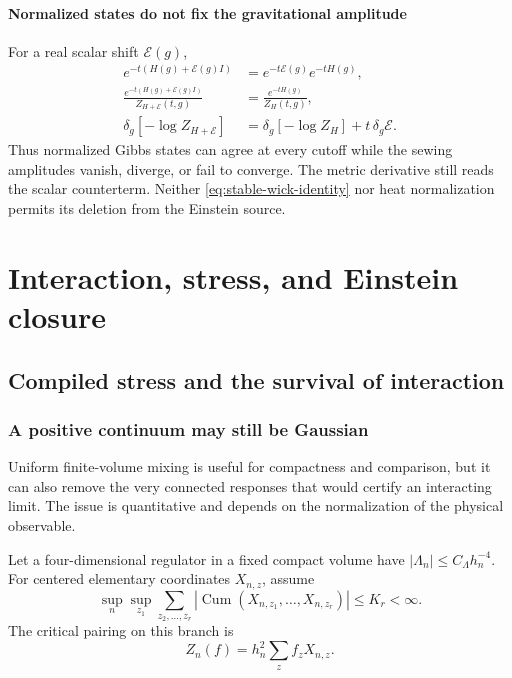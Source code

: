 \documentclass[11pt,a4paper,oneside]{book}
\theoremstyle{plain}
\theoremstyle{definition}
\theoremstyle{remark}
\newcommand{\Cum}{\operatorname{Cum}}
\newcommand{\abs}[1]{\left\lvert#1\right\rvert}
\newcommand{\src}[2]{\cite{#1}}
\begin{document}
\subsection{Normalized states do not fix the gravitational amplitude}
For a real scalar shift $\mathcal E(g)$,
\begin{equation}
 \begin{aligned}
 e^{-t(H(g)+\mathcal E(g)I)}&=e^{-t\mathcal E(g)}e^{-tH(g)},\\
 \frac{e^{-t(H(g)+\mathcal E(g)I)}}{Z_{H+\mathcal E}(t,g)}
 &=\frac{e^{-tH(g)}}{Z_H(t,g)},\\
 \delta_g[-\log Z_{H+\mathcal E}]&=
     \delta_g[-\log Z_H]+t\,\delta_g\mathcal E.
 \end{aligned}
 \label{eq:scalar-shift-source}
\end{equation}
Thus normalized Gibbs states can agree at every cutoff while the sewing
amplitudes vanish, diverge, or fail to converge.  The metric derivative
still reads the scalar counterterm.  Neither
\eqref{eq:stable-wick-identity} nor heat normalization permits its deletion
from the Einstein source.
\src{R15}{prop:v15v93-vacuum-shift,cnt:v15v93-shift}


\part{Interaction, stress, and Einstein closure}
\chapter{Compiled stress and the survival of interaction}
\label{ch:stress}
\section{A positive continuum may still be Gaussian}
Uniform finite-volume mixing is useful for compactness and comparison, but it can also remove the very connected responses that would certify an interacting limit. The issue is quantitative and depends on the normalization of the physical observable.

Let a four-dimensional regulator in a fixed compact volume have $|\Lambda_n|\le C_\Lambda h_n^{-4}$. For centered elementary coordinates $X_{n,z}$, assume
\begin{equation}
 \sup_n\sup_{z_1}\sum_{z_2,\ldots,z_r}
 \abs{\Cum(X_{n,z_1},\ldots,X_{n,z_r})}\le K_r<\infty.
 \label{eq:cumulant-stock}
\end{equation}
The critical pairing on this branch is
\begin{equation}
 Z_n(f)=h_n^2\sum_z f_zX_{n,z}.
 \label{eq:critical-field}
\end{equation}
\end{document}
